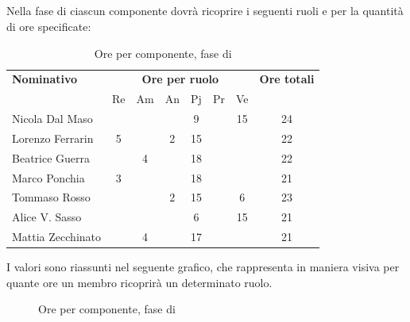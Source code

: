 \subsection{\PD}
Nella fase di \PD{} ciascun componente dovrà ricoprire i seguenti ruoli e per la quantità di ore specificate:

\begin{table}[H]
	\centering
	\begin{tabular}{|l|c|c|c|c|c|c|c|}
		\hline
		\textbf{Nominativo} & 
		\multicolumn{6}{c|}{\textbf{Ore per ruolo}} & 
		\textbf{Ore totali} \\
		& Re & Am & An & Pj & Pr & Ve & \\
		\hline
		Nicola Dal Maso & & & &9 & &15 & 24 \\
		Lorenzo Ferrarin &5 & &2 &15 & & & 22 \\
		Beatrice Guerra & &4 & &18 & & & 22 \\
		Marco Ponchia &3 & & &18 & & & 21 \\
		Tommaso Rosso & & &2 &15 & &6 & 23 \\
		Alice V. Sasso & & & &6 & &15 & 21 \\
		Mattia Zecchinato & &4 & &17 & & & 21 \\
		\hline
	\end{tabular}
	\caption{Ore per componente, fase di \PD}
\end{table}
I valori sono riassunti nel seguente grafico, che rappresenta in maniera visiva per quante ore un membro ricoprirà un determinato ruolo.
\begin{figure}[H]
	\centering
	\caption{Ore per componente, fase di \PD}
\end{figure}

